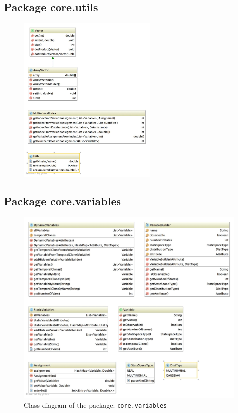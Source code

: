 \subsection{Package core.utils}
\begin{figure}[H]
  \centering
    \includegraphics[width=0.6\textwidth]{ClassDiagrams/core_utils.jpg}
\end{figure}


\subsection{Package core.variables}
\begin{figure}[H]
  \caption{Class diagram of the package: \texttt{core.variables}}
  \centering
    \includegraphics[width=\textwidth]{ClassDiagrams/core_variables.jpg}
\end{figure}

